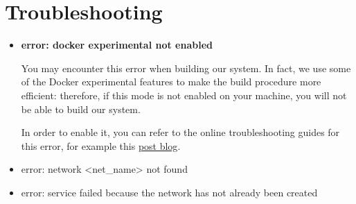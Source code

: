 \section{Troubleshooting}

\begin{itemize}

\item \textbf{error: docker experimental not enabled}

You may encounter this error when building our system.
In fact, we use some of the Docker experimental features to make the build
procedure more efficient: therefore, if this mode is not enabled on your
machine, you will not be able to build our system.

In order to enable it, you can refer to the online troubleshooting guides for
this error, for example this
\href{https://sreeninet.wordpress.com/2017/01/27/docker-1-13-experimental-features/}{post blog}.

\item error: network <net\_name> not found

\item error: service failed because the network has not already been created

\end{itemize}
